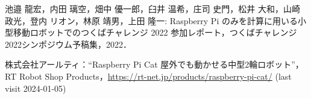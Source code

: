 \documentclass[twocolumn,9pt]{jsproceedings}
\begin{document}
\begin{thebibliography}{99}




  池邉 龍宏，内田 璃空，畑中 優一郎，臼井 温希，庄司 史門，松井 大和，山崎 政光，登内 リオン，林原 靖男，上田 隆一: Raspberry Pi のみを計算に用いる小型移動ロボットでのつくばチャレンジ 2022 参加レポート，つくばチャレンジ2022シンポジウム予稿集，2022．




  株式会社アールティ：``Raspberry Pi Cat 屋外でも動かせる中型2輪ロボット''，
  RT Robot Shop Products，\url{https://rt-net.jp/products/raspberry-pi-cat/} (last visit 2024-01-05)





\end{thebibliography}
\end{document}
